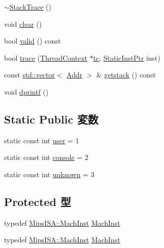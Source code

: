 \begin{DoxyCompactItemize}
\item 
\hyperlink{classMipsISA_1_1StackTrace_adec953886bb73db4f2ec91ed12810135}{$\sim$StackTrace} ()
\item 
void \hyperlink{classMipsISA_1_1StackTrace_ac8bb3912a3ce86b15842e79d0b421204}{clear} ()
\item 
bool \hyperlink{classMipsISA_1_1StackTrace_a8d985300b138b6c5556ab17ed4df3b38}{valid} () const 
\item 
bool \hyperlink{classMipsISA_1_1StackTrace_aabb136846a5e22007e44db846652ddd5}{trace} (\hyperlink{classThreadContext}{ThreadContext} $\ast$\hyperlink{classMipsISA_1_1StackTrace_a7d1b4bb6199b71a875f0eb5d9c19022b}{tc}, \hyperlink{classRefCountingPtr}{StaticInstPtr} inst)
\item 
const \hyperlink{classstd_1_1vector}{std::vector}$<$ \hyperlink{classm5_1_1params_1_1Addr}{Addr} $>$ \& \hyperlink{classMipsISA_1_1StackTrace_aceb93ba31a3756aca859b4643efeeb46}{getstack} () const 
\item 
void \hyperlink{classMipsISA_1_1StackTrace_a70fdc8802b54b4244889a2d3553405d5}{dprintf} ()
\end{DoxyCompactItemize}
\subsection*{Static Public 変数}
\begin{DoxyCompactItemize}
\item 
static const int \hyperlink{classMipsISA_1_1StackTrace_a7e10e71a86019b3f50684465746ade86}{user} = 1
\item 
static const int \hyperlink{classMipsISA_1_1StackTrace_a95d22661a526c61cfe333c6dfc982baf}{console} = 2
\item 
static const int \hyperlink{classMipsISA_1_1StackTrace_a2fe038592b561fa27aea83761959269e}{unknown} = 3
\end{DoxyCompactItemize}
\subsection*{Protected 型}
\begin{DoxyCompactItemize}
\item 
typedef \hyperlink{namespaceMipsISA_a301c22ea09fa33dcfe6ddf22f203699c}{MipsISA::MachInst} \hyperlink{classMipsISA_1_1StackTrace_a3f35b9076070a26d3e479196d6234916}{MachInst}
\item 
typedef \hyperlink{namespaceMipsISA_a301c22ea09fa33dcfe6ddf22f203699c}{MipsISA::MachInst} \hyperlink{classMipsISA_1_1StackTrace_a3f35b9076070a26d3e479196d6234916}{MachInst}
\end{DoxyCompactItemize}
